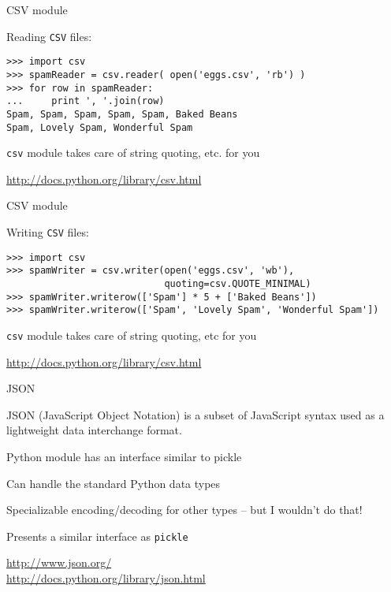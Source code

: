 \documentclass{beamer}
\begin{document}
\begin{frame}[fragile]{CSV module}

{\Large Reading \verb|CSV| files:}

\begin{verbatim}
>>> import csv
>>> spamReader = csv.reader( open('eggs.csv', 'rb') )
>>> for row in spamReader:
...     print ', '.join(row)
Spam, Spam, Spam, Spam, Spam, Baked Beans
Spam, Lovely Spam, Wonderful Spam
\end{verbatim}

\vfill
{\verb|csv| module takes care of string quoting, etc. for you}

\vfill
\url{http://docs.python.org/library/csv.html}
\end{frame}



\begin{frame}[fragile]{CSV module}

{\Large Writing \verb|CSV| files:}

\begin{verbatim}
>>> import csv
>>> spamWriter = csv.writer(open('eggs.csv', 'wb'), 
                            quoting=csv.QUOTE_MINIMAL)
>>> spamWriter.writerow(['Spam'] * 5 + ['Baked Beans'])
>>> spamWriter.writerow(['Spam', 'Lovely Spam', 'Wonderful Spam'])
\end{verbatim}

\vfill
{\verb|csv| module takes care of string quoting, etc for you}

\vfill
\url{http://docs.python.org/library/csv.html}
\end{frame}


\begin{frame}[fragile]{JSON}

\vfill
{\Large JSON (JavaScript Object Notation) is a subset of JavaScript syntax
        used as a lightweight data interchange format.}

\vfill
{\Large Python module has an interface similar to pickle}

\vfill
{\Large Can handle the standard Python data types}

\vfill
{\Large Specializable encoding/decoding for other types -- but I wouldn't do that!}

\vfill
{\Large Presents a similar interface as \verb|pickle|}

\vfill
\url{http://www.json.org/}\\
\url{http://docs.python.org/library/json.html}
\end{frame} 
\end{document}
